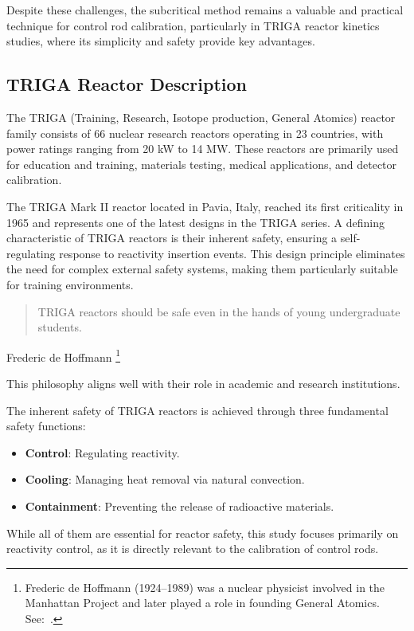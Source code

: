 Despite these challenges, the subcritical method remains a valuable and practical technique for control rod calibration, particularly in TRIGA reactor kinetics studies, where its simplicity and safety provide key advantages.

\newpage
\subsection{TRIGA Reactor Description}

The TRIGA (Training, Research, Isotope production, General Atomics) reactor family consists of 66 nuclear research reactors operating in 23 countries, with power ratings ranging from 20 kW to 14 MW. These reactors are primarily used for education and training, materials testing, medical applications, and detector calibration.

The TRIGA Mark II reactor located in Pavia, Italy, reached its first criticality in 1965 and represents one of the latest designs in the TRIGA series. A defining characteristic of TRIGA reactors is their inherent safety, ensuring a self-regulating response to reactivity insertion events. This design principle eliminates the need for complex external safety systems, making them particularly suitable for training environments.

\blockquote{{TRIGA reactors} should be safe even in the hands of young undergraduate students.}{Frederic de Hoffmann \footnote{Frederic de Hoffmann (1924–1989) was a nuclear physicist involved in the Manhattan Project and later played a role in founding General Atomics. See:~\parencite{DeHoffmann1989}.}}

This philosophy aligns well with their role in academic and research institutions.

The inherent safety of TRIGA reactors is achieved through three fundamental safety functions:
\begin{itemize}
    \item \textbf{Control}: Regulating reactivity.
    \item \textbf{Cooling}: Managing heat removal via natural convection.
    \item \textbf{Containment}: Preventing the release of radioactive materials.
\end{itemize}

While all of them are essential for reactor safety, this study focuses primarily on reactivity control, as it is directly relevant to the calibration of control rods.


